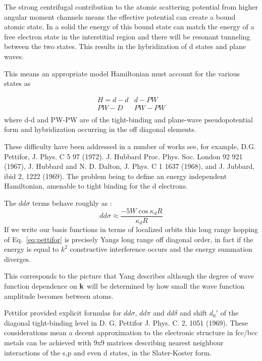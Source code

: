 \documentclass{article}
\def\k{{\bf k}}
\begin{document}
The strong centrifugal contribution to the
atomic scattering potential from higher angular moment channels means the effective potential
can create a bound atomic state. In a solid the energy of this bound state can match the 
energy of a free electron state in the interstitial region and there will
be resonant tunneling between the two states. This results in the hybridization of d states
and plane waves. 

This means an appropriate model Hamiltonian must account for the various states as

\begin{eqnarray}
\label{eq:d-hamiltonian}
H = d-d  & d-PW \\
    PW-D & PW-PW \\
\end{eqnarray}
where d-d and PW-PW are of the tight-binding and plane-wave 
pseudopotential form and hybridization occurring in the 
off diagonal elements. 

These difficulty have been addressed in a number of works 
see, for example, D.G. Pettifor, J. Phys. C 5 97 (1972).
J. Hubbard Proc. Phys. Soc. London 92 921 (1967),
J. Hubbard and N. D. Dalton, J. Phys. C 1 1637 (1968),
and J. Jubbard, ibid 2, 1222 (1969). The problem being to define an
energy independent Hamiltonian, amenable to tight binding for the d electrons.

The $dd\sigma$ terms behave roughly as \cite{pettifor71}:
%
\begin{equation}
\label{eq:pettifor}
dd\sigma \approx \frac{-5W\cos\kappa_{d}R}{\kappa_{d}R}
\end{equation}
%
If we write our basis functions in terms of localized orbits this long range hopping of
Eq.~\ref{eq:pettifor} is  precisely Yangs long range off diagonal order, in fact if 
the energy is equal to $k^{2}$ constructive interference occurs and the energy summation
diverges.

This corresponds to the picture that Yang describes although the degree of 
wave function dependence on $\k$ will be determined by how small the wave function amplitude 
becomes between atoms.

Pettifor provided explicit formulas for $dd\sigma$, $dd\pi$ and $dd\delta$ and 
shift $d_{0}'$ of the diagonal tight-binding level in D. G. Pettifor J. Phys. C. 2, 1051 (1969).
%
These considerations mean a decent approximation to the electronic structure in fcc/bcc metals
can be achieved with 9x9 matrices describing nearest neighbour interactions of the s,p and even d states,
in the Slater-Koster form.

\scriptsize


\end{document}

